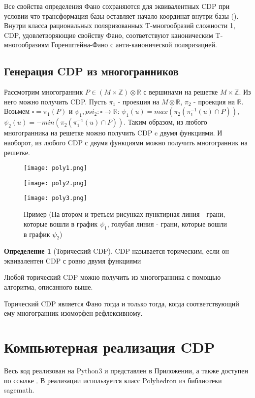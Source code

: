 \documentclass[fontsize=14pt]{scrartcl}
\theoremstyle{definition}
\newtheorem{definition}{Определение}[section]
\begin{document}
Все свойства определения Фано сохраняются для эквивалентных CDP при условии что трансформация базы оставляет начало координат внутри базы (\cite{main}).
Внутри класса рациональных поляризованных T-многообразий сложности 1, CDP, удовлетворяющие свойству Фано, соответствуют каноническим T-многообразиям Горенштейна-Фано с анти-канонической поляризацией.
\subsection{Генерация CDP из многогранников}
Рассмотрим многогранник $P \in (M \times \mathds{Z}) \otimes \mathds{R}$ с вершинами на решетке $M \times \mathds{Z}$. Из него можно получить CDP. Пусть $\pi_1$ - проекция на $M \otimes \mathds{R}$, $\pi_2$ - проекция на $\mathds{R}$. Возьмем $\square = \pi_1(P)$ и $\psi_1, psi_2: \square \rightarrow \mathds{R}$: 
$ \psi_1(u) = max(\pi_2(\pi_1^{-1}(u) \cap P))$, $\psi_2(u) = -min(\pi_2(\pi_1^{-1}(u) \cap P))$. Таким образом, из любого многогранника на решетке можно получить CDP c двумя функциями. И наоборот, из любого CDP с двумя функциями можно получить многогранник на решетке.

\begin{figure}[!htb]
  \texttt{[image: poly1.png]}
  \caption{Многогранник}\label{fig:awesome_image1}
\endminipage\hfill
{}
  \texttt{[image: poly2.png]}
  \caption{$\square = \pi_1(P)$}\label{fig:awesome_image2}
\endminipage\hfill
{}%
  \texttt{[image: poly3.png]}
  \caption{CDP}\label{fig:awesome_image3}
\endminipage
\caption{Пример (На втором и третьем рисунках пунктирная линия - грани, которые вошли в график  $\psi_1$, голубая линия - грани, которые вошли в график $\psi_2$)}
\end{figure}

\begin{definition}[Торический CDP]
CDP называется торическим, если он эквивалентен CDP с ровно двумя функциями
\end{definition}

Любой торический CDP можно получить из многогранника с помощью алгоритма, описанного выше.

Торический CDP является Фано тогда и только тогда, когда соответствующий ему многогранник изоморфен рефлексивному.
\section{Компьютерная реализация CDP}
Весь код реализован на Python3 и представлен в Приложении, а также доступен по ссылке \href{https://github.com/irina-batmanova/masters}. В реализации используется класс Polyhedron из библиотеки sagemath.
\end{document}
